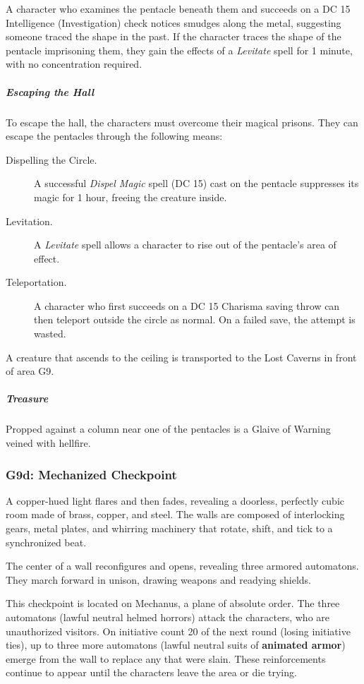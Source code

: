 \documentclass[10pt,a4paper,twoside,bg=print,twocolumn,openany,nodeprecatedcode]{dndbook}
\begin{document}
A character who examines the pentacle beneath them and succeeds on a DC 15 Intelligence (Investigation) check notices smudges along the metal, suggesting someone traced the shape in the past. If the character traces the shape of the pentacle imprisoning them, they gain the effects of a \textit{Levitate} spell for 1 minute, with no concentration required.

\subparagraph{Escaping the Hall}
To escape the hall, the characters must overcome their magical prisons. They can escape the pentacles through the following means:


\begin{description}
\item[Dispelling the Circle.]
A successful \textit{Dispel Magic} spell (DC 15) cast on the pentacle suppresses its magic for 1 hour, freeing the creature inside.
\item[Levitation.]
A \textit{Levitate} spell allows a character to rise out of the pentacle's area of effect.
\item[Teleportation.]
A character who first succeeds on a DC 15 Charisma saving throw can then teleport outside the circle as normal. On a failed save, the attempt is wasted.
\end{description}

A creature that ascends to the ceiling is transported to the Lost Caverns in front of area G9.

\subparagraph{Treasure}
Propped against a column near one of the pentacles is a Glaive of Warning veined with hellfire.

\subsubsection{G9d: Mechanized Checkpoint}
\begin{DndReadAloud}{}
A copper-hued light flares and then fades, revealing a doorless, perfectly cubic room made of brass, copper, and steel. The walls are composed of interlocking gears, metal plates, and whirring machinery that rotate, shift, and tick to a synchronized beat.

The center of a wall reconfigures and opens, revealing three armored automatons. They march forward in unison, drawing weapons and readying shields.

\end{DndReadAloud}

This checkpoint is located on Mechanus, a plane of absolute order. The three automatons (lawful neutral helmed horrors) attack the characters, who are unauthorized visitors. On initiative count 20 of the next round (losing initiative ties), up to three more automatons (lawful neutral suits of \textbf{animated armor}) emerge from the wall to replace any that were slain. These reinforcements continue to appear until the characters leave the area or die trying.
\end{document}
